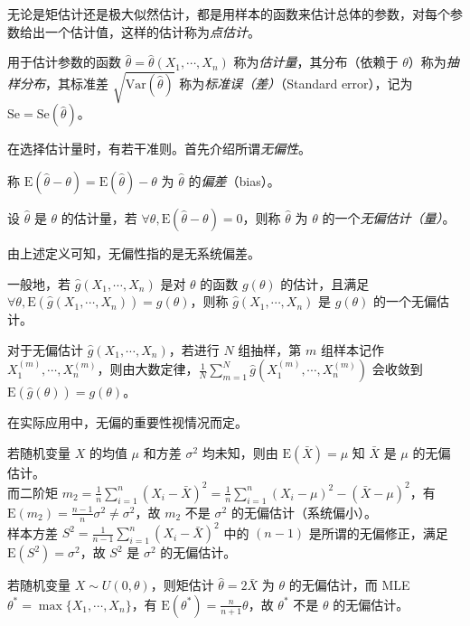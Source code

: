 \documentclass[../main.tex]{subfiles}
\begin{document}
无论是矩估计还是极大似然估计，都是用样本的函数来估计总体的参数，对每个参数给出一个估计值，这样的估计称为\emph{点估计}。

用于估计参数的函数 $\hat\theta=\hat\theta(X_1,\cdots,X_n)$ 称为\emph{估计量}，其分布（依赖于 $\theta$）称为\emph{抽样分布}，其标准差 $\sqrt{\mathrm{Var}(\hat\theta)}$ 称为\emph{标准误（差）}（Standard error），记为 $\mathrm{Se}=\mathrm{Se}(\hat\theta)$。

在选择估计量时，有若干准则。首先介绍所谓\emph{无偏性}。

称 $\mathrm E(\hat\theta-\theta)=\mathrm E(\hat\theta)-\theta$ 为 $\hat\theta$ 的\emph{偏差}（bias）。

\begin{definition}\label{def:6.3.1}
    设 $\hat\theta$ 是 $\theta$ 的估计量，若 $\forall\theta,\mathrm E(\hat\theta-\theta)=0$，则称 $\hat\theta$ 为 $\theta$ 的一个\emph{无偏估计（量）}。
\end{definition}

由上述定义可知，无偏性指的是无系统偏差。

一般地，若 $\hat g(X_1,\cdots,X_n)$ 是对 $\theta$ 的函数 $g(\theta)$ 的估计，且满足 $\forall\theta,\mathrm E(\hat g(X_1,\cdots,X_n))=g(\theta)$，则称 $\hat g(X_1,\cdots,X_n)$ 是 $g(\theta)$ 的一个无偏估计。

对于无偏估计 $\hat g(X_1,\cdots,X_n)$，若进行 $N$ 组抽样，第 $m$ 组样本记作 $X_1^{(m)},\cdots,X_n^{(m)}$，则由大数定律，$\frac1N\sum_{m=1}^N\hat g(X_1^{(m)},\cdots,X_n^{(m)})$ 会收敛到 $\mathrm E(\hat g(\theta))=g(\theta)$。

在实际应用中，无偏的重要性视情况而定。

\begin{example}
    若随机变量 $X$ 的均值 $\mu$ 和方差 $\sigma^2$ 均未知，则由 $\mathrm E(\bar X)=\mu$ 知 $\bar X$ 是 $\mu$ 的无偏估计。\\
    而二阶矩 $m_2= \frac1n\sum_{i=1}^n(X_i-\bar X)^2=\frac1n\sum_{i=1}^n(X_i-\mu)^2-(\bar X-\mu)^2$，有 $\mathrm E(m_2)=\frac{n-1}n\sigma^2\neq\sigma^2$，故 $m_2$ 不是 $\sigma^2$ 的无偏估计（系统偏小）。\\
    样本方差 $S^2=\frac1{n-1}\sum_{i=1}^n(X_i-\bar X)^2$ 中的 $(n-1)$ 是所谓的无偏修正，满足 $\mathrm E(S^2)=\sigma^2$，故 $S^2$ 是 $\sigma^2$ 的无偏估计。
\end{example}

\begin{example}
    若随机变量 $X\sim U(0,\theta)$，则矩估计 $\hat\theta=2\bar X$ 为 $\theta$ 的无偏估计，而 MLE $\theta^*=\max\{X_1,\cdots,X_n\}$，有 $\mathrm E(\theta^*)=\frac n{n+1}\theta$，故 $\theta^*$ 不是 $\theta$ 的无偏估计。
\end{example}
\end{document}
